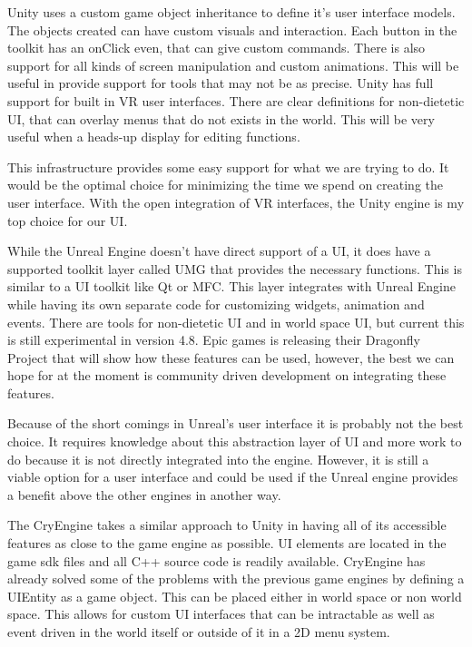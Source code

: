 \documentclass[onecolumn, draftclsnofoot,10pt, compsoc]{IEEEtran}
\newcounter{threesection}[subsubsection]
\begin{document}
Unity uses a custom game object inheritance to define it's user interface models. The objects created can have custom visuals and interaction. Each button in the toolkit has an onClick even, that can give custom commands. There is also support for all kinds of screen manipulation and custom animations. This will be useful in provide support for tools that may not be as precise. Unity has full support for built in VR user interfaces. There are clear definitions for non-dietetic UI, that can overlay menus that do not exists in the world. This will be very useful when a heads-up display for editing functions.

This infrastructure provides some easy support for what we are trying to do. It would be the optimal choice for minimizing the time we spend on creating the user interface. With the open integration of VR interfaces, the Unity engine is my top choice for our UI. 

While the Unreal Engine doesn't have direct support of a UI, it does have a supported toolkit layer called UMG that provides the necessary functions. This is similar to a UI toolkit like Qt or MFC. This layer integrates with Unreal Engine while having its own separate code for customizing widgets, animation and events. There are tools for non-dietetic UI and in world space UI, but current this is still experimental in version 4.8. Epic games is releasing their Dragonfly Project that will show how these features can be used, however, the best we can hope for at the moment is community driven development on integrating these features.

Because of the short comings in Unreal's user interface it is probably not the best choice. It requires knowledge about this abstraction layer of UI and more work to do because it is not directly integrated into the engine. However, it is still a viable option for a user interface and could be used if the Unreal engine provides a benefit above the other engines in another way.

The CryEngine takes a similar approach to Unity in having all of its accessible features as close to the game engine as possible. UI elements are located in the game sdk files and all C++ source code is readily available. CryEngine has already solved some of the problems with the previous game engines by defining a UIEntity as a game object. This can be placed either in world space or non world space. This allows for custom UI interfaces that can be intractable as well as event driven in the world itself or outside of it in a 2D menu system.
\end{document}
